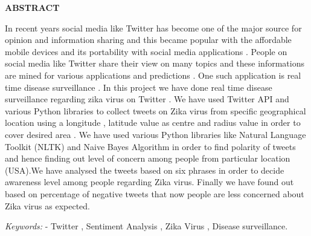 \newpage
\newpage
{}
\begin{center}
{\large \bf ABSTRACT}
\end{center}
In recent years social media like Twitter has become one of the major source for opinion and information sharing and this became popular with the affordable mobile devices and its portability with social media applications . People on social media like Twitter share their view on many topics and these informations are mined for various applications and predictions . One such application is real time disease surveillance . In this project we have done real time disease surveillance regarding zika virus on Twitter .  We have used Twitter API and various Python libraries to collect tweets on Zika virus from specific geographical location using a longitude , latitude value as centre and radius value in order to cover desired area . We have used various Python libraries like Natural Language Toolkit (NLTK) and Naive Bayes Algorithm in order to find polarity of tweets and hence finding out level of concern among people from particular location (USA).We have analysed the tweets based on six phrases in order to decide awareness level among people regarding Zika virus. Finally we have found out based on percentage of negative tweets that now people are less concerned about Zika virus as expected.

{\it Keywords:} - Twitter , Sentiment Analysis , Zika Virus , Disease surveillance.